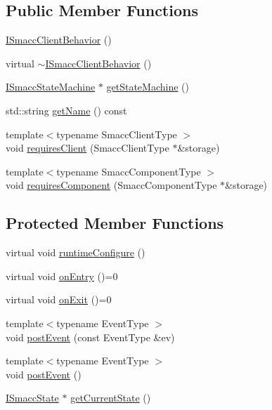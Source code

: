 \subsection*{Public Member Functions}
\begin{DoxyCompactItemize}
\item 
\hyperlink{classsmacc_1_1ISmaccClientBehavior_a12fe603a4b66efe6c190c63da422c7d7}{I\+Smacc\+Client\+Behavior} ()
\item 
virtual \hyperlink{classsmacc_1_1ISmaccClientBehavior_a916a04c467ae5e98c5fc11909f0098f3}{$\sim$\+I\+Smacc\+Client\+Behavior} ()
\item 
\hyperlink{classsmacc_1_1ISmaccStateMachine}{I\+Smacc\+State\+Machine} $\ast$ \hyperlink{classsmacc_1_1ISmaccClientBehavior_a9d55a85bf0a920033805a3c050de2019}{get\+State\+Machine} ()
\item 
std\+::string \hyperlink{classsmacc_1_1ISmaccClientBehavior_a18e4bec9460b010f2894c0f7e7064a34}{get\+Name} () const
\item 
{\footnotesize template$<$typename Smacc\+Client\+Type $>$ }\\void \hyperlink{classsmacc_1_1ISmaccClientBehavior_a32b16e99e3b4cb289414203dc861a440}{requires\+Client} (Smacc\+Client\+Type $\ast$\&storage)
\item 
{\footnotesize template$<$typename Smacc\+Component\+Type $>$ }\\void \hyperlink{classsmacc_1_1ISmaccClientBehavior_a19c6d658c8e809bb93bfdc9b639a3ac3}{requires\+Component} (Smacc\+Component\+Type $\ast$\&storage)
\end{DoxyCompactItemize}
\subsection*{Protected Member Functions}
\begin{DoxyCompactItemize}
\item 
virtual void \hyperlink{classsmacc_1_1ISmaccClientBehavior_a1078de57f291301cc2829c3548fa5ea5}{runtime\+Configure} ()
\item 
virtual void \hyperlink{classsmacc_1_1ISmaccClientBehavior_af1cfb6b9846e6ced881ee4cd514e1553}{on\+Entry} ()=0
\item 
virtual void \hyperlink{classsmacc_1_1ISmaccClientBehavior_a753cfd7b96539419559f619d552723f1}{on\+Exit} ()=0
\item 
{\footnotesize template$<$typename Event\+Type $>$ }\\void \hyperlink{classsmacc_1_1ISmaccClientBehavior_af8c7fc75e85d717ecee0dcd254f71681}{post\+Event} (const Event\+Type \&ev)
\item 
{\footnotesize template$<$typename Event\+Type $>$ }\\void \hyperlink{classsmacc_1_1ISmaccClientBehavior_a5db577c585935114058770f2b7242f8a}{post\+Event} ()
\item 
\hyperlink{classsmacc_1_1ISmaccState}{I\+Smacc\+State} $\ast$ \hyperlink{classsmacc_1_1ISmaccClientBehavior_a34fde34e48fa13db622ee60d8374d0b8}{get\+Current\+State} ()
\end{DoxyCompactItemize}
